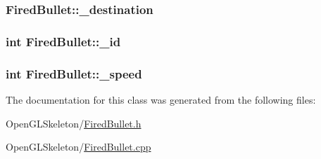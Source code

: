 \subsubsection[{\texorpdfstring{\+\_\+destination}{_destination}}]{ Fired\+Bullet\+::\+\_\+destination}\hypertarget{class_fired_bullet_a288c5a49e15534f75c3ec5fde81dfa28}{}\label{class_fired_bullet_a288c5a49e15534f75c3ec5fde81dfa28}
\subsubsection[{\texorpdfstring{\+\_\+id}{_id}}]{\setlength{\rightskip}{0pt plus 5cm}int Fired\+Bullet\+::\+\_\+id}\hypertarget{class_fired_bullet_aec3fb0f356070b8dfa295b771f8afb2e}{}\label{class_fired_bullet_aec3fb0f356070b8dfa295b771f8afb2e}
\subsubsection[{\texorpdfstring{\+\_\+speed}{_speed}}]{\setlength{\rightskip}{0pt plus 5cm}int Fired\+Bullet\+::\+\_\+speed}\hypertarget{class_fired_bullet_a740fdbda74e1c585cc1771d56d2a9807}{}\label{class_fired_bullet_a740fdbda74e1c585cc1771d56d2a9807}


The documentation for this class was generated from the following files\+:\begin{DoxyCompactItemize}
\item 
Open\+G\+L\+Skeleton/\hyperlink{_fired_bullet_8h}{Fired\+Bullet.\+h}\item 
Open\+G\+L\+Skeleton/\hyperlink{_fired_bullet_8cpp}{Fired\+Bullet.\+cpp}\end{DoxyCompactItemize}
